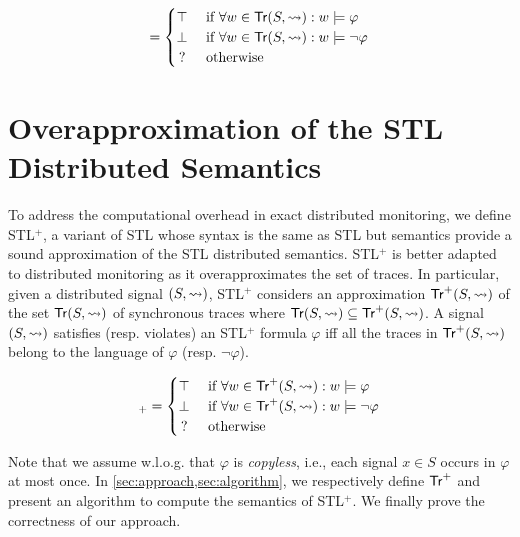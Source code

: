 	\footnotesize
	\begin{equation*}
		[(S,{\hb}) \models \varphi] = 
		\begin{cases}
			\top & \text{ if } \forall w \in \tr(S,{\hb}) : w \models \varphi \\
			\bot & \text{ if } \forall w \in \tr(S,{\hb}) : w \models \lnot\varphi \\
			\,? & \text{ otherwise}
		\end{cases}
	\end{equation*}
	\normalsize


\section{Overapproximation of the STL Distributed Semantics}
\label{sec:semantics}

To address the computational overhead in exact distributed monitoring, we define STL$^+$, a variant of STL whose syntax is the same as STL but semantics provide a sound approximation of the STL distributed semantics.
STL$^+$ is better adapted to distributed monitoring as it overapproximates the set of traces.
In particular, given a distributed signal $(S,{\rightsquigarrow})$, STL$^+$ considers an approximation 
$\mathsf{Tr}^+(S,{\rightsquigarrow})$ of the set $\mathsf{Tr}(S,{\rightsquigarrow})$ of synchronous traces where $ \mathsf{Tr}(S,{\rightsquigarrow}) \subseteq \mathsf{Tr}^+(S,{\rightsquigarrow})$.
A signal $(S,{\rightsquigarrow})$ satisfies (resp. violates) an STL$^+$ formula $\varphi$ iff all the traces in $\mathsf{Tr}^+(S,{\rightsquigarrow})$ belong to the language of $\varphi$ (resp. $\lnot \varphi$).

\footnotesize
\begin{equation*}
	[(S,{\hb}) \models \varphi]_+ = 
	\begin{cases}
		\top & \text{ if } \forall w \in \tr^+(S,{\hb}) : w \models \varphi \\
		\bot & \text{ if } \forall w \in \tr^+(S,{\hb}) : w \models \lnot\varphi \\
		\,? & \text{ otherwise}
	\end{cases}
\end{equation*}
\normalsize

Note that we assume w.l.o.g. that $\varphi$ is \emph{copyless}, i.e., each signal $x \in S$ occurs in $\varphi$ at most once.
In \cref{sec:approach,sec:algorithm}, we respectively define $\mathsf{Tr}^+$ and present an algorithm to compute the semantics of STL$^+$.
We finally prove the correctness of our approach.

